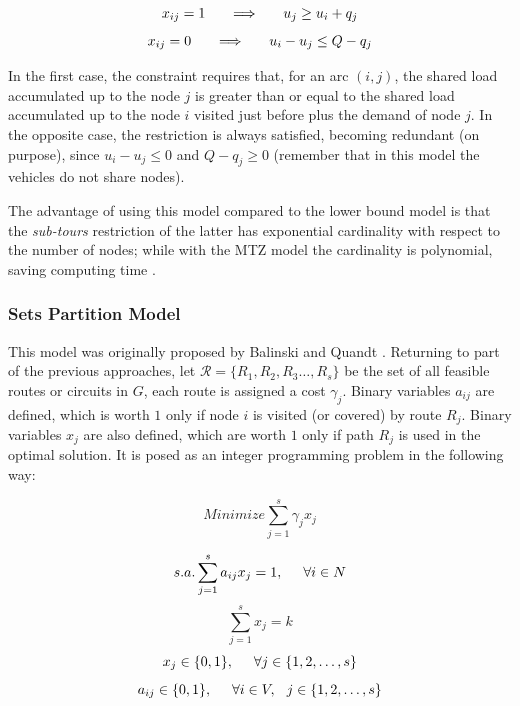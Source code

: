 \documentclass{amsart}
\begin{document}
            \[x_{ij} = 1 \hspace{0.5cm} \implies \hspace{0.5 cm} u_j \geq u_i + q_j\]
            \[x_{ij} = 0 \hspace{0.5cm} \implies \hspace{0.5 cm} u_i - u_j \leq Q - q_j\]

            In the first case, the constraint requires that, for an arc $(i, j)$, the shared load accumulated up to the node $j$ is greater than or equal to the shared load accumulated up to the node $i$ visited just before plus the demand of node $j$. In the opposite case, the restriction is always satisfied, becoming redundant (on purpose), since $u_i - u_j \leq 0$ and $Q - q_j \geq 0$ (remember that in this model the vehicles do not share nodes).

            The advantage of using this model compared to the lower bound model is that the \textit{sub-tours} restriction of the latter has exponential cardinality with respect to the number of nodes; while with the MTZ model the cardinality is polynomial, saving computing time \parencite{García2010}.

            \subsubsection*{Sets Partition Model \parencite{García2010, Toth2002}}
            This model was originally proposed by Balinski and Quandt \parencite{Balinski1964}. Returning to part of the previous approaches, let $\mathcal{R} = \{R_1, R_2, R_3 \ldots , R_s\}$ be the set of all feasible routes or circuits in $G$, each route is assigned a cost $\gamma_j$. Binary variables $a_{ij}$ are defined, which is worth $1$ only if node $i$ is visited (or covered) by route $R_j$. Binary variables $x_j$ are also defined, which are worth $1$ only if path $R_j$ is used in the optimal solution. It is posed as an integer programming problem in the following way:

            \begin{equation}
                Minimize \sum_{j=1}^s \gamma_j x_j
            \end{equation}

            \[s.a. \sum_{j=1}^s a_{ij} x_j = 1, \hspace{0.5cm} \forall i \in N\]
            \[\sum_{j=1}^s x_j = k \]
            \[x_j \in \{0, 1\}, \hspace{0.5cm} \forall j \in \{1, 2, \ldots , s\} \]
            \[a_{ij} \in \{0, 1\}, \hspace{0.5cm} \forall i \in V, \hspace{0.25cm} j \in \{1, 2, \ldots , s\} \]
\end{document}
